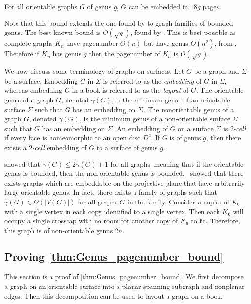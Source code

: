 \begin{theorem}\label{thm:Genus_pagenumber_bound}
	For all orientable graphs \(G\) of genus $g$, $G$ can be embedded in $18g$ pages.
\end{theorem}
Note that this bound extends the one found by \textcite{yannakakisEmbeddingPlanarGraphs1989} to graph families of bounded genus.
The best known bound is \(O(\sqrt{g})\), found by \textcite{malitzGenusGraphsHave1994}. This is best possible as complete graphs $K_n$ have pagenumber $O(n)$ but have genus $O(n^2)$, from \textcite{ringelMapColorTheorem1974}. Therefore if $K_n$ has genus $g$ then the pagenumber of $K_n$ is $O(\sqrt{g})$.

We now discuss some terminology of graphs on surfaces. Let $G$ be a graph and $\Sigma$ be a surface. Embedding $G$ in $\Sigma$ is referred to as the \textit{embedding} of $G$ in $\Sigma$, whereas embedding $G$ in a book is referred to as the \textit{layout} of $G$. The orientable genus of a graph \(G\), denoted \(\gamma(G)\), is the minimum genus of an orientable surface $\Sigma$ such that $G$ has an embedding on $\Sigma$. The nonorientable genus of a graph \(G\), denoted \(\tilde{\gamma}(G)\), is the minimum genus of a non-orientable surface $\Sigma$ such that $G$ has an embedding on $\Sigma$. An embedding of $G$ on a surface $\Sigma$ is \textit{$2$-cell} if every face is homeomorphic to an open disc $D^2$. If $G$ is of genus $g$, then there exists a \textit{$2$-cell} embedding of $G$ to a surface of genus $g$. 


\textcite{moharOrientableGenusGraphs1998} showed that \(\tilde{\gamma}(G) \leq 2 \gamma(G) + 1\) for all graphs, meaning that if the orientable genus is bounded, then the non-orientable genus is bounded.\ \textcite{auslanderImbeddingGraphsManifolds1963} showed that there exists graphs which are embeddable on the projective plane that have arbitrarily large orientable genus. In fact, there exists a family of graphs such that $\tilde{\gamma}(G) \in \Omega(|V(G)|)$ for all graphs $G$ in the family. Consider $n$ copies of $K_6$ with a single vertex in each copy identified to a single vertex. Then each $K_6$ will occupy a single crosscap with no room for another copy of $K_6$ to fit. Therefore, this graph is of non-orientable genus $2n$. 

\subsection{Proving \cref{thm:Genus_pagenumber_bound}}
This section is a proof of \cref{thm:Genus_pagenumber_bound}. We first decompose a graph on an orientable surface into a planar spanning subgraph and nonplanar edges. Then this decomposition can be used to layout a graph on a book.

